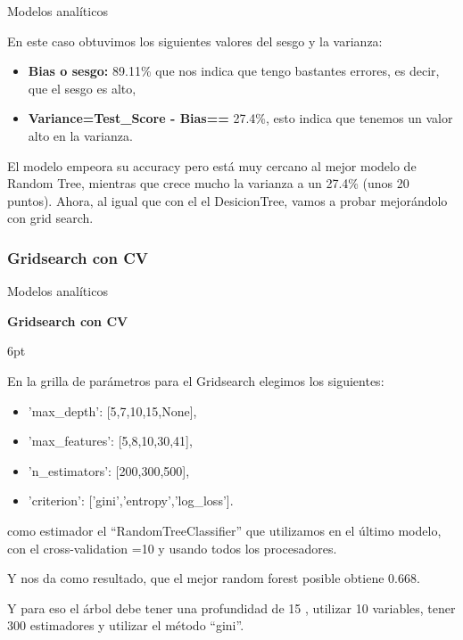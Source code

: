 \documentclass[pdf]{beamer}
\def\vspace{}%
\begin{document}
\begin{frame}{Modelos analíticos}

    En este caso  obtuvimos los siguientes valores del sesgo y la varianza:
    \begin{itemize}
        \item \textbf{Bias o sesgo:} 89.11\% que nos indica que tengo bastantes errores, es decir, que el sesgo es alto,
        \item \textbf{Variance=Test\_Score - Bias==} 27.4\%, esto indica que tenemos un valor alto en la varianza.
        \end{itemize}

    El modelo empeora su accuracy pero está muy cercano al mejor modelo de Random Tree, mientras que crece mucho la varianza a un 27.4\% (unos 20 puntos). Ahora, al igual que con el el DesicionTree, vamos a probar mejorándolo con grid search.

\end{frame}

    \subsubsection{Gridsearch con CV}

\begin{frame}{Modelos analíticos}

    \begin{Large}
        \textbf{Gridsearch con CV}
    \end{Large}
    \vspace{6pt}

    En la grilla de parámetros para el Gridsearch elegimos los siguientes:
    \begin{itemize}
        \item 'max\_depth': [5,7,10,15,None],
        \item 'max\_features': [5,8,10,30,41],
        \item 'n\_estimators': [200,300,500],
        \item 'criterion': ['gini','entropy','log\_loss'].
    \end{itemize}
    como estimador el ``RandomTreeClassifier'' que utilizamos en el último modelo, con el cross-validation =10 y  usando todos los procesadores.

    Y nos da como resultado, que el mejor random forest posible obtiene 0.668. 

    Y para eso el árbol debe tener una profundidad de 15 , utilizar  10  variables, tener  300  estimadores y utilizar el método ``gini''.

\end{frame}
\end{document}
